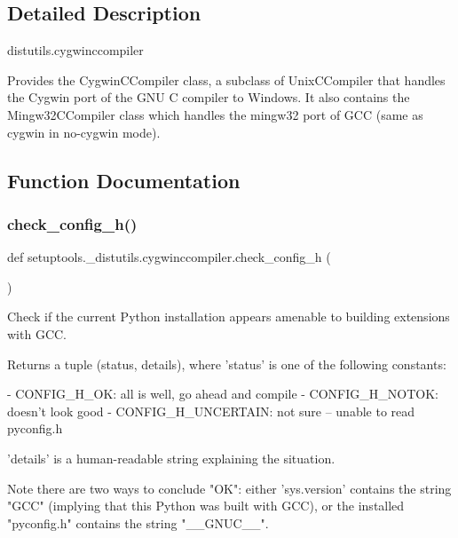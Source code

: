 \subsection{Detailed Description}
\begin{DoxyVerb}distutils.cygwinccompiler

Provides the CygwinCCompiler class, a subclass of UnixCCompiler that
handles the Cygwin port of the GNU C compiler to Windows.  It also contains
the Mingw32CCompiler class which handles the mingw32 port of GCC (same as
cygwin in no-cygwin mode).
\end{DoxyVerb}
 

\subsection{Function Documentation}
\mbox{\label{namespacesetuptools_1_1__distutils_1_1cygwinccompiler_a463933b8a69aeb1a261c61ddcb1ba458}} 
\subsubsection{\texorpdfstring{check\+\_\+config\+\_\+h()}{check\_config\_h()}}
{\footnotesize\ttfamily def setuptools.\+\_\+distutils.\+cygwinccompiler.\+check\+\_\+config\+\_\+h (\begin{DoxyParamCaption}{ }\end{DoxyParamCaption})}

\begin{DoxyVerb}Check if the current Python installation appears amenable to building
extensions with GCC.

Returns a tuple (status, details), where 'status' is one of the following
constants:

- CONFIG_H_OK: all is well, go ahead and compile
- CONFIG_H_NOTOK: doesn't look good
- CONFIG_H_UNCERTAIN: not sure -- unable to read pyconfig.h

'details' is a human-readable string explaining the situation.

Note there are two ways to conclude "OK": either 'sys.version' contains
the string "GCC" (implying that this Python was built with GCC), or the
installed "pyconfig.h" contains the string "__GNUC__".
\end{DoxyVerb}
 \mbox{\label{namespacesetuptools_1_1__distutils_1_1cygwinccompiler_ade1ff0a9a8d625a0d03a2183a98808f0}} 
